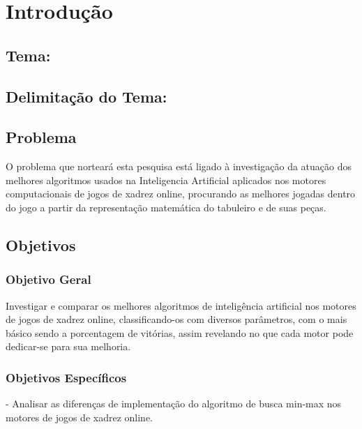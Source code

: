 

\chapter{Introdução}
\section[Tema]{Tema: {}}

\section[Delimitação do Tema]{Delimitação do Tema: {}}
\section{Problema}
O problema que norteará esta pesquisa está ligado à investigação da atuação dos melhores algoritmos usados na Inteligencia Artificial
aplicados nos  motores computacionais de jogos de xadrez online, procurando as melhores jogadas dentro do jogo a partir da representação
matemática do tabuleiro e de suas peças.
\section{Objetivos}
\subsection{Objetivo Geral}
Investigar e comparar os melhores algoritmos de inteligência artificial nos motores de jogos de xadrez online, classificando-os com diversos parâmetros,
com o mais básico sendo a porcentagem de vitórias, assim revelando no que cada motor pode dedicar-se para sua melhoria.
\subsection{Objetivos Específicos}
- Analisar as diferenças de implementação do algoritmo de busca min-max nos motores de jogos de xadrez online.

